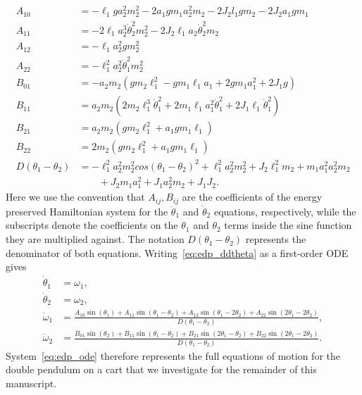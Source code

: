 \documentclass[11pt]{article}
\numberwithin{equation}{section}
\theoremstyle{plain}
\begin{document}
\begin{equation}
    \begin{split}
        A_{10} &= - \ell_1ga_2^2m_2^2 - 2a_1gm_1a_2^2m_2 - 2J_2l_1gm_2 - 2J_2a_1gm_1 \\
        A_{11} &= - 2\ell_1a_2^3\dot{\theta}_2^2m_2^2 - 2J_2\ell_1a_2\dot{\theta}_2^2m_2 \\
        A_{12} &= -\ell_1a_2^2gm_2^2 \\
        A_{22} &= -\ell_1^2a_2^2\dot{\theta}_1^2m_2^2 \\
        B_{01} &= -a_2m_2(gm_2\ell_1^2 - gm_1\ell_1a_1 + 2gm_1a_1^2 + 2J_1g)\\
        B_{11} &= a_2m_2(2m_2\ell_1^3\dot{\theta}_1^2 + 2m_1\ell_1a_1^2\dot{\theta}_1^2 + 2J_1\ell_1\dot{\theta}_1^2)\\
        B_{21} &= a_2m_2(gm_2\ell_1^2 + a_1gm_1\ell_1)\\
        B_{22} &= 2m_2(gm_2\ell_1^2 + a_1gm_1\ell_1)\\
        D(\theta_1 - \theta_2) &=-\ell_1^2a_2^2m_2^2cos(\theta_1-\theta_2)^2 + \ell_1^2a_2^2m_2^2 +  J_2\ell_1^2m_2 + m_1a_1^2a_2^2m_2 \\&\qquad + J_2m_1a_1^2 + J_1a_2^2m_2 + J_1J_2.
    \end{split}
\end{equation}
Here we use the convention that $A_{ij},B_{ij}$ are the coefficients of the energy preserved Hamiltonian system for the $\ddot\theta_1$ and $\ddot\theta_2$ equations, respectively, while the subscripts denote the coefficients on the $\theta_1$ and $\theta_2$ terms inside the sine function they are multiplied against. The notation $D(\theta_1 - \theta_2)$ represents the denominator of both equations. Writing~\eqref{eq:edp_ddtheta} as a first-order ODE gives
\begin{subequations}\label{eq:edp_ode}
\begin{align}
        \dot{\theta}_1&=\omega_1,\\
        \dot{\theta}_2&=\omega_2,\\
        \dot{\omega}_1&=\frac{A_{10}\sin(\theta_1)+A_{11}\sin(\theta_1-\theta_2)+A_{12}\sin(\theta_1-2\theta_2)+A_{22}\sin(2\theta_1-2\theta_2)}{D(\theta_1 - \theta_2)},\\
        \dot{\omega}_2&=\frac{B_{01}\sin(\theta_2)+B_{11}\sin(\theta_1-\theta_2)+B_{21}\sin(2\theta_1-\theta_2)+B_{22}\sin(2\theta_1-2\theta_2)}{D(\theta_1 - \theta_2)}.
\end{align}
\end{subequations}
System~\eqref{eq:edp_ode} therefore represents the full equations of motion for the double pendulum on a cart that we investigate for the remainder of this manuscript. 
\end{document}
